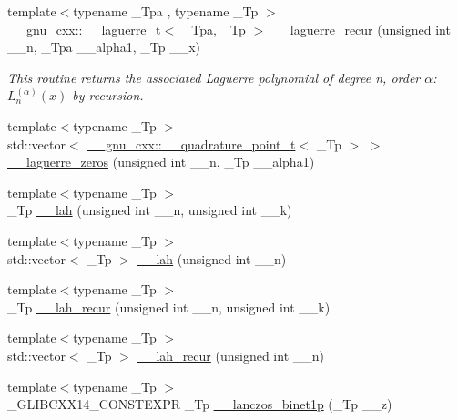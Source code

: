 \begin{DoxyCompactItemize}
{\footnotesize template$<$typename \+\_\+\+Tpa , typename \+\_\+\+Tp $>$ }\\\hyperlink{struct____gnu__cxx_1_1____laguerre__t}{\+\_\+\+\_\+gnu\+\_\+cxx\+::\+\_\+\+\_\+laguerre\+\_\+t}$<$ \+\_\+\+Tpa, \+\_\+\+Tp $>$ \hyperlink{namespacestd_1_1____detail_ab5344b00cf4ed8b39c9132ce0b9287af}{\+\_\+\+\_\+laguerre\+\_\+recur} (unsigned int \+\_\+\+\_\+n, \+\_\+\+Tpa \+\_\+\+\_\+alpha1, \+\_\+\+Tp \+\_\+\+\_\+x)
\begin{DoxyCompactList}\small\item\em This routine returns the associated Laguerre polynomial of degree {\ttfamily n}, order {\ttfamily $ \alpha $}\+: $ L_n^{(\alpha)}(x) $ by recursion. \end{DoxyCompactList}\item 
{\footnotesize template$<$typename \+\_\+\+Tp $>$ }\\std\+::vector$<$ \hyperlink{struct____gnu__cxx_1_1____quadrature__point__t}{\+\_\+\+\_\+gnu\+\_\+cxx\+::\+\_\+\+\_\+quadrature\+\_\+point\+\_\+t}$<$ \+\_\+\+Tp $>$ $>$ \hyperlink{namespacestd_1_1____detail_a12f5145d6544afee991b30a30020e86b}{\+\_\+\+\_\+laguerre\+\_\+zeros} (unsigned int \+\_\+\+\_\+n, \+\_\+\+Tp \+\_\+\+\_\+alpha1)
\item 
{\footnotesize template$<$typename \+\_\+\+Tp $>$ }\\\+\_\+\+Tp \hyperlink{namespacestd_1_1____detail_ac124597fd6b7d77f4474d62dda0b5715}{\+\_\+\+\_\+lah} (unsigned int \+\_\+\+\_\+n, unsigned int \+\_\+\+\_\+k)
\item 
{\footnotesize template$<$typename \+\_\+\+Tp $>$ }\\std\+::vector$<$ \+\_\+\+Tp $>$ \hyperlink{namespacestd_1_1____detail_af6d01a95dbd0418929960fa127e01b99}{\+\_\+\+\_\+lah} (unsigned int \+\_\+\+\_\+n)
\item 
{\footnotesize template$<$typename \+\_\+\+Tp $>$ }\\\+\_\+\+Tp \hyperlink{namespacestd_1_1____detail_ac3e6ae56f6e6e31636f0bc46a11d9b8e}{\+\_\+\+\_\+lah\+\_\+recur} (unsigned int \+\_\+\+\_\+n, unsigned int \+\_\+\+\_\+k)
\item 
{\footnotesize template$<$typename \+\_\+\+Tp $>$ }\\std\+::vector$<$ \+\_\+\+Tp $>$ \hyperlink{namespacestd_1_1____detail_a335ad35b2674153db0fe4da6d025afae}{\+\_\+\+\_\+lah\+\_\+recur} (unsigned int \+\_\+\+\_\+n)
\item 
{\footnotesize template$<$typename \+\_\+\+Tp $>$ }\\\+\_\+\+G\+L\+I\+B\+C\+X\+X14\+\_\+\+C\+O\+N\+S\+T\+E\+X\+PR \+\_\+\+Tp \hyperlink{namespacestd_1_1____detail_a84722b82d6d614aa4653eb7559f7d508}{\+\_\+\+\_\+lanczos\+\_\+binet1p} (\+\_\+\+Tp \+\_\+\+\_\+z)

\end{DoxyCompactItemize}
